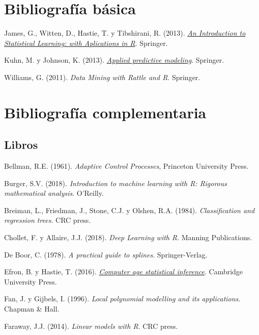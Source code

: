 \documentclass[
]{book}
\theoremstyle{break}
\theoremstyle{definition}
\theoremstyle{definition}
\theoremstyle{definition}
\theoremstyle{remark}
\begin{document}
\hypertarget{bibliografuxeda-buxe1sica}{%
\section*{Bibliografía básica}\label{bibliografuxeda-buxe1sica}}

James, G., Witten, D., Hastie, T. y Tibshirani, R. (2013). \emph{\href{http://faculty.marshall.usc.edu/gareth-james/ISL}{An Introduction to Statistical Learning: with Aplications in R}}. Springer.

Kuhn, M. y Johnson, K. (2013). \emph{\href{http://appliedpredictivemodeling.com}{Applied predictive modeling}}. Springer.

Williams, G. (2011). \emph{Data Mining with Rattle and R}. Springer.

\hypertarget{bibliografuxeda-complementaria}{%
\section*{Bibliografía complementaria}\label{bibliografuxeda-complementaria}}

\hypertarget{libros}{%
\subsection*{Libros}\label{libros}}

Bellman, R.E. (1961). \emph{Adaptive Control Processes}, Princeton University Press.

Burger, S.V. (2018). \emph{Introduction to machine learning with R: Rigorous mathematical analysis}. O'Reilly.

Breiman, L., Friedman, J., Stone, C.J. y Olshen, R.A. (1984). \emph{Classification and regression trees}. CRC press.

Chollet, F. y Allaire, J.J. (2018). \emph{Deep Learning with R}. Manning Publications.

De Boor, C. (1978). \emph{A practical guide to splines}. Springer-Verlag.

Efron, B. y Hastie, T. (2016). \emph{\href{http://web.stanford.edu/~hastie/CASI/}{Computer age statistical inference}}. Cambridge University Press.

Fan, J. y Gijbels, I. (1996). \emph{Local polynomial modelling and its applications}. Chapman \& Hall.

Faraway, J.J. (2014). \emph{Linear models with R}. CRC press.
\end{document}

